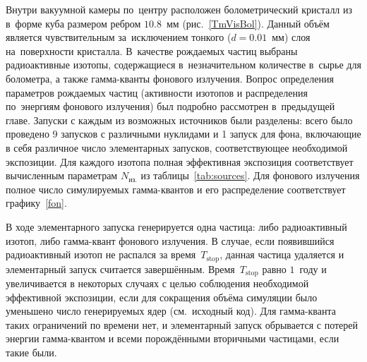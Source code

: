 \documentclass[a4paper,article,14pt]{extarticle}
\begin{document}
Внутри вакуумной камеры по~центру расположен болометрический кристалл из~{\TmAlO} в~форме куба размером ребром $10.8$~мм (рис.~\ref{TmVisBol}).
Данный объём является чувствительным за~исключением тонкого ($d=0.01$~мм) слоя на~поверхности кристалла.
В~качестве рождаемых частиц выбраны радиоактивные изотопы, содержащиеся в~незначительном количестве в~сырье для болометра, а также гамма-кванты фонового излучения.
Вопрос определения параметров рождаемых частиц (активности изотопов и распределения по~энергиям фонового излучения) был подробно рассмотрен в~предыдущей главе.
Запуски с каждым из возможных источников были разделены: всего было проведено 9 запусков с различными нуклидами и 1 запуск для фона, включающие в себя различное число элементарных запусков, соответствующее необходимой экспозиции.
Для каждого изотопа полная эффективная экспозиция соответствует вычисленным параметрам $N_{\text{из.}}$ из таблицы~\ref{tab:sources}.
Для фонового излучения полное число симулируемых гамма-квантов и его распределение соответствует графику~\ref{fon}.

В ходе элементарного запуска генерируется одна частица: либо радиоактивный изотоп, либо гамма-квант фонового излучения.
В случае, если появившийся радиоактивный изотоп не распался за время~$T_{\mathrm{stop}}$, данная частица удаляется и элементарный запуск считается завершённым.
Время~$T_{\mathrm{stop}}$ равно $1$~году и увеличивается в некоторых случаях с целью соблюдения необходимой эффективной экспозиции, если  для сокращения объёма симуляции было уменьшено число генерируемых ядер (см.~исходный код).
Для гамма-кванта таких ограничений по времени нет, и элементарный запуск обрывается с потерей энергии гамма-квантом и всеми порождёнными вторичными частицами, если такие были.
\end{document}
